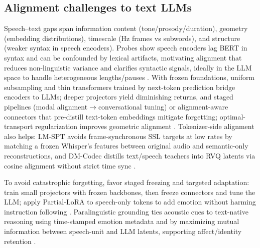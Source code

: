 \documentclass{article}
\begin{document}
\subsection{Alignment challenges to text LLMs} \label{subsec:alignmentchallengestotextllms}
Speech--text gaps span information content (tone/prosody/duration), geometry (embedding distributions), timescale (Hz frames vs subwords), and structure (weaker syntax in speech encoders). Probes show speech encoders lag BERT in syntax and can be confounded by lexical artifacts, motivating alignment that reduces non-linguistic variance and clarifies syntactic signals, ideally in the LLM space to handle heterogeneous lengths/pauses \cite{shen2023wavesyntaxprobingspokenlanguagemodels,xu2025optimaltransportregularizationspeechtext}. With frozen foundations, uniform subsampling and thin transformers trained by next-token prediction bridge encoders to LLMs; deeper projectors yield diminishing returns, and staged pipelines (modal alignment$\rightarrow$conversational tuning) or alignment-aware connectors that pre-distill text-token embeddings mitigate forgetting; optimal-transport regularization improves geometric alignment \cite{wang2023slmbridgethingapbetweenspeechtextfoundat,shu2023llasmlargelanguagespeechmodel,tan2025ssralignmentawaremodalityconnectorspeech,xu2025optimaltransportregularizationspeechtext}. Tokenizer-side alignment also helps: LM-SPT avoids frame-synchronous SSL targets at low rates by matching a frozen Whisper's features between original audio and semantic-only reconstructions, and DM-Codec distills text/speech teachers into RVQ latents via cosine alignment without strict time sync \cite{jo2025lmsptalignedsemanticdistillationspeechto,ahasan2025dmcodecdistillingmultimodalrepresentatio}.

To avoid catastrophic forgetting, favor staged freezing and targeted adaptation: train small projectors with frozen backbones, then freeze connectors and tune the LLM; apply Partial-LoRA to speech-only tokens to add emotion without harming instruction following \cite{wang2023slmbridgethingapbetweenspeechtextfoundat,tan2025ssralignmentawaremodalityconnectorspeech,wang2024blspemotowardsempatheticlargespeechlangu}. Paralinguistic grounding ties acoustic cues to text-native reasoning using time-stamped emotion metadata and by maximizing mutual information between speech-unit and LLM latents, supporting affect/identity retention \cite{wang2025incorporatingcontextualparalinguisticund,wang2025bossbeyondsemanticspeech}.
\end{document}
